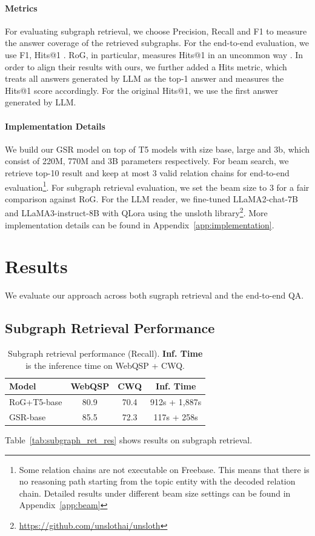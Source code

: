 \documentclass[11pt]{article}
\begin{document}
\paragraph{Metrics}
For evaluating subgraph retrieval, we choose Precision, Recall and F1 to measure the answer coverage of the retrieved subgraphs. For the end-to-end evaluation, we use F1, Hits@1 \citep{zhang-etal-2022-subgraph, luo2023chatkbqa}. RoG, in particular, measures Hits@1 in an uncommon way \citep{luo2024reasoning}. In order to align their results with ours, we further added a Hits metric, which treats all answers generated by LLM as the top-1 answer and measures the Hits@1 score accordingly. For the original Hits@1, we use the first answer generated by LLM.

\paragraph{Implementation Details}
We build our GSR model on top of T5 models with size base, large and 3b, which consist of 220M, 770M and 3B parameters respectively. For beam search, we retrieve top-10 result and keep at most 3 valid relation chains for end-to-end evaluation\footnote{Some relation chains are not executable on Freebase. This means that there is no reasoning path starting from the topic entity with the decoded relation chain. Detailed results under different beam size settings can be found in Appendix~\ref{app:beam}}. For subgraph retrieval evaluation, we set the beam size to 3 for a fair comparison against RoG. For the LLM reader, we fine-tuned LLaMA2-chat-7B and LLaMA3-instruct-8B with QLora \citep{dettmers2023qlora} using the unsloth library\footnote{\url{https://github.com/unslothai/unsloth}}. More implementation details can be found in Appendix~\ref{app:implementation}.


\section{Results}
We evaluate our approach across both sugraph retrieval and the end-to-end QA.
\subsection{Subgraph Retrieval Performance}

\begin{table}[t]
    \centering
    \small
    \begin{tabular}{l|ccc}
    \toprule
        \textbf{Model} & \textbf{WebQSP} & \textbf{CWQ} & \textbf{Inf. Time} \\ \midrule
        RoG+T5-base & 80.9 & 70.4 & 912s + 1,887s \\
        GSR-base & 85.5 & 72.3 & 117s + 258s \\ 
    \bottomrule
    \end{tabular}
    \caption{Subgraph retrieval performance (Recall). \textbf{Inf. Time} is the inference time on WebQSP + CWQ.}
    \label{tab:rog-small}
\end{table}
Table~\ref{tab:subgraph_ret_res} shows results on subgraph retrieval.
\end{document}
